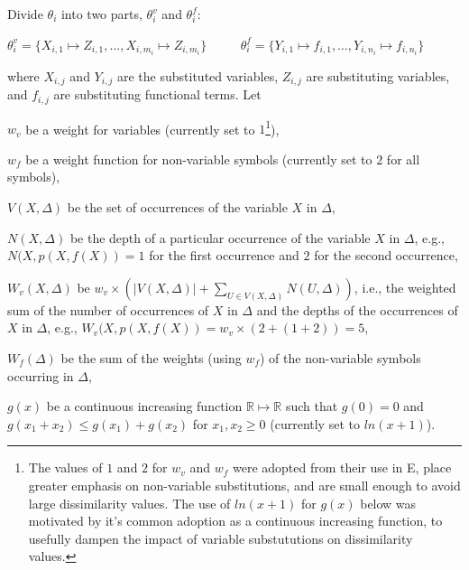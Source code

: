 \documentclass[]{ceurart}
\newenvironment{packed_itemize}{
\vspace*{-0.5em}
\begin{itemize}
  \setlength{\partopsep}{0pt}
  \setlength{\itemsep}{1pt}
  \setlength{\parskip}{0pt}
  \setlength{\parsep}{0pt}
}{\end{itemize}}
\begin{document}
Divide $\theta_i$ into two parts, $\theta_i^v$ and $\theta_i^f$:
\begin{center}
$\theta_i^v=\{X_{i,1}\mapsto Z_{i,1},\dots,X_{i,m_i}\mapsto Z_{i,m_i}\}$
~~~~
$\theta_i^f=\{Y_{i,1}\mapsto f_{i,1},\dots,Y_{i,n_i}\mapsto f_{i,n_i}\}$
\end{center}
where $X_{i,j}$ and $Y_{i,j}$ are the substituted variables, 
$Z_{i,j}$ are substituting variables, and
$f_{i,j}$ are substituting functional terms.
Let
\begin{packed_itemize}
\item $w_v$ be a weight for variables (currently set to $1$\footnote{%
The values of $1$ and $2$ for $w_v$ and $w_f$ were adopted from their use 
in E, place greater emphasis on non-variable substitutions, and are small 
enough to avoid large dissimilarity values.
The use of $ln(x+1)$ for $g(x)$ below was motivated by it's common
adoption as a continuous increasing function, to usefully dampen the
impact of variable substututions on dissimilarity values.}),
\item $w_f$ be a weight function for non-variable symbols (currently
      set to $2$ for all symbols),
\item $V(X,\Delta)$ be the set of occurrences of the variable $X$ in $\Delta$,
\item $N(X,\Delta)$ be the depth of a particular occurrence of the 
      variable $X$ in $\Delta$, e.g., $N(X,p(X,f(X)) = 1$ for the first 
      occurrence and $2$ for the second occurrence,
\item $W_v(X,\Delta)$ be 
      $w_v \times (|V(X,\Delta)| + \sum_{U \in V(X,\Delta)} N(U,\Delta))$,
      i.e., the weighted sum of the number of occurrences of $X$ in $\Delta$ 
      and the depths of the occurrences of $X$ in $\Delta$, e.g., 
      $W_v(X,p(X,f(X)) = w_v \times (2 + (1+2)) = 5$,
\item $W_f(\Delta)$ be the sum of the weights (using $w_f$) of the 
      non-variable symbols occurring in $\Delta$,
\item $g(x)$ be a continuous increasing function 
      $\mathbb{R} \mapsto \mathbb{R}$ such that 
      $g(0)=0$
      and
      $g(x_1+x_2) \leq g(x_1)+ g(x_2)$ for $x_1, x_2\geq0$
      (currently set to $ln(x+1)$).
\end{packed_itemize}
\end{document}
